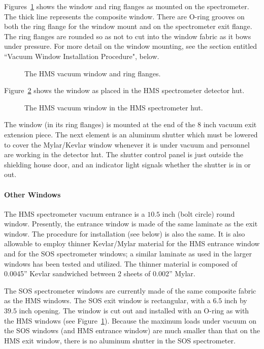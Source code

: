 Figures~\ref{fig:hms_window} shows the
window and ring flanges as mounted on the spectrometer. The thick
line represents the composite window. There are O-ring grooves on both the
ring flange for the window mount and on the spectrometer exit flange.
The ring flanges are rounded so as not to cut into the window fabric as
it bows under pressure.
For more detail on the window mounting, see
the section entitled ``Vacuum Window Installation Procedure", below.

\begin{figure}
\caption{The HMS vacuum window and ring flanges. \label{fig:hms_window}}
\end{figure}

Figure~\ref{fig:hms_window2} shows the window as placed in the HMS spectrometer
detector hut.
\begin{figure}
\caption{The HMS vacuum window in the HMS spectrometer hut. 
\label{fig:hms_window2}}
\end{figure}

The window (in its ring flanges) is mounted at the end of the $8$ inch
vacuum exit extension piece. The next element is an aluminum shutter which
must be lowered to cover the Mylar/Kevlar window whenever it is under
vacuum and personnel are working in the detector hut. The shutter
control panel is just outside the shielding house door, and an
indicator light signals whether the shutter is in or out.  

\paragraph{Other Windows}

The HMS spectrometer vacuum entrance is a $10.5$ inch (bolt circle) round
window. Presently, the entrance window
is made of the same laminate as the exit window. The
procedure for installation (see below) is also the same.
It is
also allowable to employ thinner Kevlar/Mylar
material for the HMS entrance window and for
the SOS spectrometer windows; a similar laminate as used in the
larger windows has been tested and utilized.  The thinner material is
composed of 0.0045'' Kevlar sandwiched between 2 sheets of 0.002'' Mylar.

The SOS spectrometer windows are currently made of the same composite fabric
as the HMS windows. The SOS exit window is rectangular, with a $6.5$ inch
by $39.5$ inch opening.
The window is cut out and installed with an O-ring as with the HMS
windows (see Figure~\ref{fig:hms_window}).
Because the maximum
loads under vacuum on the SOS windows (and HMS entrance window)
are much smaller than that on the HMS exit window,
there is
no aluminum shutter in the SOS spectrometer.


